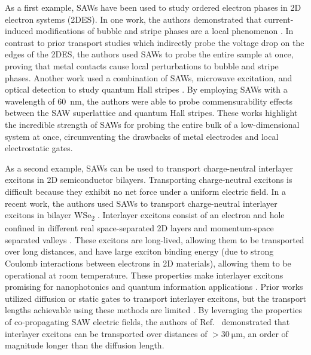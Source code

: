 \documentclass{beavtex_dub_edit}
\begin{document}
As a first example, SAWs have been used to study ordered electron phases in 2D electron systems (2DES). In one work, the authors demonstrated that current-induced modifications of bubble and stripe phases are a local phenomenon \cite{friess_current_2018}. In contrast to prior transport studies which indirectly probe the voltage drop on the edges of the 2DES, the authors used SAWs to probe the entire sample at once, proving that metal contacts cause local perturbations to bubble and stripe phases. Another work used a combination of SAWs, microwave excitation, and optical detection to study quantum Hall stripes \cite{kukushkin_collective_2011}. By employing SAWs with a wavelength of \SI{60}{\nano\meter}, the authors were able to probe commensurability effects between the SAW superlattice and quantum Hall stripes. These works highlight the incredible strength of SAWs for probing the entire bulk of a low-dimensional system at once, circumventing the drawbacks of metal electrodes and local electrostatic gates. 

As a second example, SAWs can be used to transport charge-neutral interlayer excitons in 2D semiconductor bilayers. Transporting charge-neutral excitons is difficult because they exhibit no net force under a uniform electric field. In a recent work, the authors used SAWs to transport charge-neutral interlayer excitons in bilayer WSe\textsubscript{2} \cite{peng_long-range_2022}. Interlayer excitons consist of an electron and hole confined in different real space-separated 2D layers and momentum-space separated valleys \cite{rivera_interlayer_2018}. These excitons are long-lived, allowing them to be transported over long distances, and have large exciton binding energy (due to strong Coulomb interactions between electrons in 2D materials), allowing them to be operational at room temperature. These properties make interlayer excitons promising for nanophotonics and quantum information applications \cite{kuznetsova_all-optical_2010, tran_evidence_2019, liu_electrically_2020}. Prior works utilized diffusion or static gates to transport interlayer excitons, but the transport lengths achievable using these methods are limited \cite{jauregui_electrical_2019,unuchek_room-temperature_2018, liu_electrically_2020}. By leveraging the properties of co-propagating SAW electric fields, the authors of Ref.\ \cite{peng_long-range_2022} demonstrated that interlayer excitons can be transported over distances of $> \SI{30}{\micro\meter}$, an order of magnitude longer than the diffusion length. 
\end{document}
